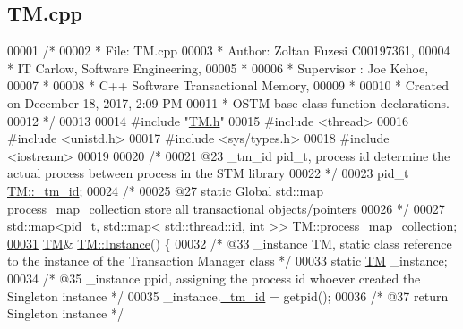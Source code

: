 \hypertarget{_t_m_8cpp_source}{}\subsection{T\+M.\+cpp}

\begin{DoxyCode}
00001 \textcolor{comment}{/* }
00002 \textcolor{comment}{ * File:   TM.cpp}
00003 \textcolor{comment}{ * Author: Zoltan Fuzesi C00197361, }
00004 \textcolor{comment}{ * IT Carlow, Software Engineering, }
00005 \textcolor{comment}{ *}
00006 \textcolor{comment}{ * Supervisor : Joe Kehoe, }
00007 \textcolor{comment}{ *}
00008 \textcolor{comment}{ * C++ Software Transactional Memory, }
00009 \textcolor{comment}{ * }
00010 \textcolor{comment}{ * Created on December 18, 2017, 2:09 PM}
00011 \textcolor{comment}{ * OSTM base class function declarations.}
00012 \textcolor{comment}{ */}
00013 
00014 \textcolor{preprocessor}{#include "\hyperlink{_t_m_8h}{TM.h}"}
00015 \textcolor{preprocessor}{#include <thread>}
00016 \textcolor{preprocessor}{#include <unistd.h>}
00017 \textcolor{preprocessor}{#include <sys/types.h>}
00018 \textcolor{preprocessor}{#include <iostream>}
00019 
00020 \textcolor{comment}{/*}
00021 \textcolor{comment}{   @23 \_tm\_id pid\_t, process id determine the actual process between process in the STM library}
00022 \textcolor{comment}{ */}
00023 pid\_t \hyperlink{class_t_m_a9d49d0ddef82337e54b684c9e1e8ad21_a9d49d0ddef82337e54b684c9e1e8ad21}{TM::\_tm\_id};
00024 \textcolor{comment}{/*}
00025 \textcolor{comment}{   @27 static Global std::map process\_map\_collection store all transactional objects/pointers}
00026 \textcolor{comment}{ */}
00027 std::map<pid\_t, std::map< std::thread::id, int >> \hyperlink{class_t_m_a6d417b18213968da2a70a914e80d639b_a6d417b18213968da2a70a914e80d639b}{TM::process\_map\_collection};
\hypertarget{_t_m_8cpp_source.tex_l00031}{}\hyperlink{class_t_m_a7ce5f35e0dae76df4fe116cf905bbe60_a7ce5f35e0dae76df4fe116cf905bbe60}{00031} \hyperlink{class_t_m}{TM}& \hyperlink{class_t_m_a7ce5f35e0dae76df4fe116cf905bbe60_a7ce5f35e0dae76df4fe116cf905bbe60}{TM::Instance}() \{
00032    \textcolor{comment}{/* @33 \_instance TM, static class reference to the instance of the Transaction Manager class */}
00033     \textcolor{keyword}{static} \hyperlink{class_t_m}{TM} \_instance;
00034     \textcolor{comment}{/* @35 \_instance ppid, assigning the process id whoever created the Singleton instance */}
00035     \_instance.\hyperlink{class_t_m_a9d49d0ddef82337e54b684c9e1e8ad21_a9d49d0ddef82337e54b684c9e1e8ad21}{\_tm\_id} = getpid();
00036     \textcolor{comment}{/* @37 return Singleton instance */}

\end{DoxyCode}
